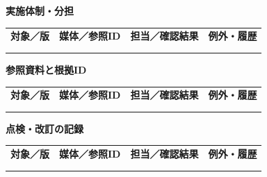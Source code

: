 \documentclass[11pt,a4paper]{article}
\begin{document}
\par{}\noindent\textbf{実施体制・分担}\par\vspace{1mm}
{\fontsize{8.5}{13}\selectfont
\begin{tabularx}{\linewidth}{@{}XXXX@{}}
\textbf{対象／版} & \textbf{媒体／参照ID} & \textbf{担当／確認結果} & \textbf{例外・履歴}\\[2mm]
\strut & \strut & \strut & \strut\\[5mm]
\strut & \strut & \strut & \strut\\[5mm]
\end{tabularx}
}\vspace{2mm}\par
{}
\par{}\noindent\textbf{参照資料と根拠ID}\par\vspace{1mm}
{\fontsize{8.5}{13}\selectfont
\begin{tabularx}{\linewidth}{@{}XXXX@{}}
\textbf{対象／版} & \textbf{媒体／参照ID} & \textbf{担当／確認結果} & \textbf{例外・履歴}\\[2mm]
\strut & \strut & \strut & \strut\\[5mm]
\strut & \strut & \strut & \strut\\[5mm]
\end{tabularx}
}\vspace{2mm}\par
{}
\par{}\noindent\textbf{点検・改訂の記録}\par\vspace{1mm}
{\fontsize{8.5}{13}\selectfont
\begin{tabularx}{\linewidth}{@{}XXXX@{}}
\textbf{対象／版} & \textbf{媒体／参照ID} & \textbf{担当／確認結果} & \textbf{例外・履歴}\\[2mm]
\strut & \strut & \strut & \strut\\[5mm]
\strut & \strut & \strut & \strut\\[5mm]
\end{tabularx}
}\vspace{2mm}\par
\end{document}
